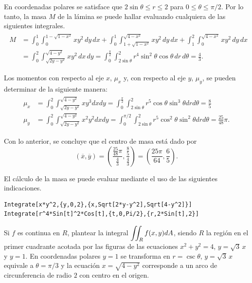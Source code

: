 En coordenadas polares se satisface que $2\sin \theta \leq r \leq 2$ para $0 \leq \theta \leq \pi/2$. Por lo tanto, la masa $M$ de la lámina se puede hallar evaluando cualquiera de las siguientes integrales.
%
\begin{gather*}
\begin{aligned}
M &= \int_{0}^{1} \int_{0}^{1-\sqrt{1-x^{2}}}xy^{2} \,dy\,dx
+ \int_{0}^{1} \int_{1+\sqrt{1-x^{2}}}^{\sqrt{4-x^{2}}} xy^{2} \,dy\,dx
+ \int_{1}^{2} \int_{0}^{\sqrt{4-x^{2}}} xy^{2} \,dy\,dx \\
&= \int_{0}^{2} \int_{\sqrt{2y - y^{2}}}^{\sqrt{4 - y^{2}}} xy^{2} \,dx\,dy
= \int_{0}^{\frac{\pi}{2}} \int_{2\sin\theta}^{2} r^{4} \sin^{2}\theta \cos\theta \,dr\,d\theta
= \frac{4}{3}.
\end{aligned}
\end{gather*}

Los momentos con respecto al eje $x$, $\mu_{x}$ y, con respecto al eje $y$, $\mu_{y}$,
se pueden determinar de la siguiente manera:
\begin{gather*}
  \begin{aligned}
\mu_{x}&=\int_{0}^{2}\int_{\sqrt{2y-y^{2}}}^{\sqrt{4-y^{2}}}xy^{3}dxdy=\int_{0}^{\frac{\pi }{2}}\int_{2\sin \theta }^2r^{5}\cos \theta \sin^{3}\theta drd\theta=\frac{8}{5}\\
\mu_{y}&= \int_{0}^{2}\int_{\sqrt{2y-y^{2}}}^{\sqrt{4-y^{2}}}x^{2}y^{2}dxdy=\int_{0}^{\pi /2}\int_{2\sin \theta }^{2} r^5 \cos^2 \theta\sin^2 \theta drd\theta =\frac{25}{48}\pi.
  \end{aligned}
\end{gather*}

Con lo anterior, se concluye que el centro de masa está dado por
\[(\overline{x},\overline{y})= \left( \frac{\frac{25}{48}\pi }{\frac{4}{3}},\frac{\frac{8}{5}}{\frac{4}{3}}\right) = \left( \frac{25\pi }{64},\frac{6}{5}\right).\]

El cálculo de la masa se puede evaluar mediante el uso de las siguientes indicaciones.

\begin{tcolorbox}[title=\bf Instrucción en \verb"Mathematica"]\begin{Verbatim}[formatcom=\letraverbatim]
Integrate[x*y^2,{y,0,2},{x,Sqrt[2*y-y^2],Sqrt[4-y^2]}]
Integrate[r^4*Sin[t]^2*Cos[t],{t,0,Pi/2},{r,2*Sin[t],2}]
\end{Verbatim}
\end{tcolorbox}

\begin{parrafonumerado}[resume=ordenint]
\item
Si $f$ es continua en $R$, plantear la integral $\displaystyle\iint_R f(x,y)dA$, siendo $R$ la región en el primer cuadrante acotada por las figuras de las ecuaciones $x^2+y^2=4$, $y= \sqrt{3}\,x$ y $y=1$.
En coordenadas polares $y=1$ se transforma en $r= \csc \theta$, $y= \sqrt{3}\,x$ equivale a $\theta = \pi /3 $ y la ecuación $x=\sqrt{4-y^2}$ corresponde a un arco de circunferencia de radio $2$ con centro en el origen.
\end{parrafonumerado}

